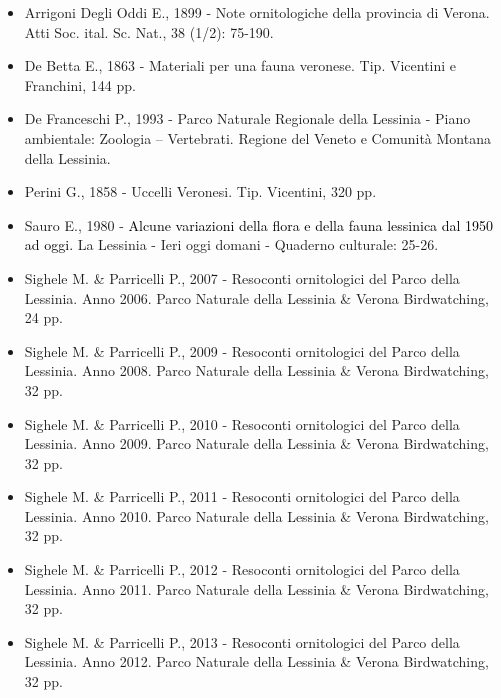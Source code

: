 \begin{itemize}\itemsep0pt
	\item Arrigoni Degli Oddi E., 1899 - Note ornitologiche della provincia di
Verona. Atti Soc. ital. Sc. Nat., 38 (1/2): 75-190.

	\item De Betta E., 1863 - Materiali per una fauna veronese. Tip.
Vicentini e Franchini, 144 pp.

	\item {De Franceschi P., 1993 - Parco Naturale Regionale della Lessinia - Piano ambientale: Zoologia
-- Vertebrati. {Regione del Veneto e Comunit\`a Montana della Lessinia.}}

	\item Perini G., 1858 - Uccelli Veronesi. Tip. Vicentini, 320 pp.

	\item Sauro E., 1980 - \textcolor{black}{Alcune variazioni della flora e della
fauna lessinica dal 1950 ad oggi. }La Lessinia - Ieri oggi
domani - Quaderno culturale: 25-26.

	\item Sighele M. \& Parricelli P., 2007 - Resoconti ornitologici del Parco
della Lessinia. Anno 2006. Parco Naturale della Lessinia \&
Verona Birdwatching, 24 pp.

	\item Sighele M. \& Parricelli P., 2009 - Resoconti ornitologici del Parco
della Lessinia. Anno 2008. Parco Naturale della Lessinia \&
Verona Birdwatching, 32 pp.

	\item Sighele M. \& Parricelli P., 2010 - Resoconti ornitologici del Parco
della Lessinia. Anno 2009. Parco Naturale della Lessinia \&
Verona Birdwatching, 32 pp.

	\item Sighele M. \& Parricelli P., 2011 - Resoconti ornitologici del Parco
della Lessinia. Anno 2010. Parco Naturale della Lessinia \&
Verona Birdwatching, 32 pp.

	\item Sighele M. \& Parricelli P., 2012 - Resoconti ornitologici del Parco
della Lessinia. Anno 2011. Parco Naturale della Lessinia \&
Verona Birdwatching, 32 pp.

	\item Sighele M. \& Parricelli P., 2013 - Resoconti ornitologici del Parco
della Lessinia. Anno 2012. Parco Naturale della Lessinia \&
Verona Birdwatching, 32 pp.
\end{itemize}
